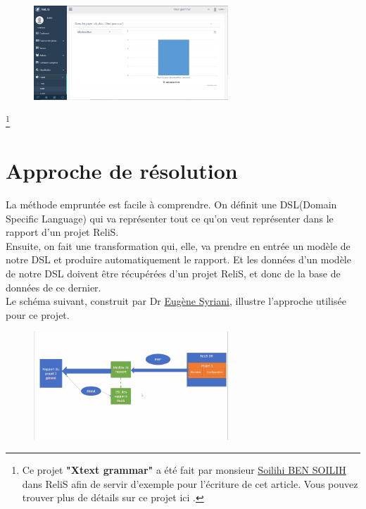 \begin{description}
        \begin{figure}[H]
        \centering
        \includegraphics[width=0.65\textwidth]{resources/images/classification.PNG}
    \end{figure}
\end{description}

\footnote[1]{ Ce projet \textbf{"Xtext grammar"} a été fait par monsieur \href{https://www.bensoilih.com/}{Soilihi BEN SOILIH} dans ReliS afin de servir d'exemple pour l'écriture de cet article. Vous pouvez trouver plus de détails sur ce projet ici 
\cite{soilih}.}

\newpage

\section{Approche de résolution}

La méthode empruntée est facile à comprendre. On définit une DSL(Domain Specific Language) qui va représenter tout ce qu'on veut représenter dans le rapport d'un projet ReliS. \\
Ensuite, on fait une transformation qui, elle, va prendre en entrée un modèle de notre DSL et produire automatiquement le rapport. Et les données d'un modèle de notre DSL doivent être récupérées d'un projet ReliS, et donc de la base de données de ce dernier.\\
Le schéma suivant, construit par Dr \href{http://www-ens.iro.umontreal.ca/~syriani/index.php}{Eugène Syriani}, illustre l'approche utilisée pour ce projet.

\begin{figure}[H]
        \centering
        \includegraphics[width=0.65\textwidth]{resources/images/approach.PNG}
\end{figure}

